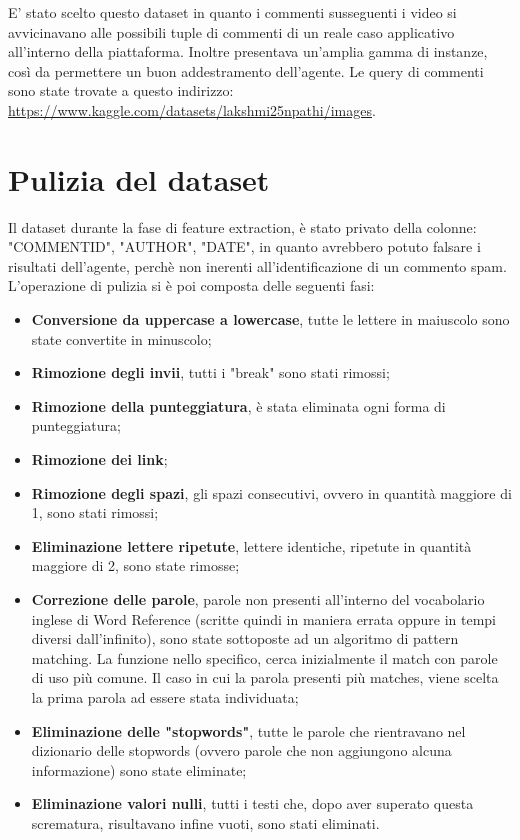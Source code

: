 \documentclass{report}
\begin{document}
    E' stato scelto questo dataset in quanto i commenti susseguenti i video si avvicinavano alle possibili tuple di commenti
    di un reale caso applicativo all'interno della piattaforma.
    Inoltre presentava un'amplia gamma di instanze, così da permettere un buon addestramento dell'agente.
    Le query di commenti sono state trovate a questo indirizzo: \newline 
    \href{https://www.kaggle.com/datasets/lakshmi25npathi/images}{https://www.kaggle.com/datasets/lakshmi25npathi/images}.
    
    \section{Pulizia del dataset}
    Il dataset durante la fase di feature extraction, 
    è stato privato della colonne: "COMMENT\textunderscore ID", "AUTHOR", "DATE", in quanto avrebbero potuto falsare i risultati dell'agente, 
    perchè non inerenti all'identificazione di un commento spam.
    L'operazione di pulizia si è poi composta delle seguenti fasi: 

    \begin{itemize}
        \item {\bfseries Conversione da uppercase a lowercase}, tutte le lettere in maiuscolo sono state convertite in minuscolo;
        \item {\bfseries Rimozione degli invii}, tutti i "break" sono stati rimossi;
        \item {\bfseries Rimozione della punteggiatura}, è stata eliminata ogni forma di punteggiatura;
        \item {\bfseries Rimozione dei link};
        \item {\bfseries Rimozione degli spazi}, gli spazi consecutivi, ovvero in  quantità maggiore di 1, sono stati rimossi;
        \item {\bfseries Eliminazione lettere ripetute}, lettere identiche, ripetute in quantità maggiore di 2, sono state rimosse;
        \item {\bfseries Correzione delle parole}, parole non presenti all'interno del vocabolario inglese di Word Reference (scritte quindi in maniera errata oppure in tempi diversi dall'infinito), sono state sottoposte 
        ad un algoritmo di pattern matching. La funzione nello specifico, cerca inizialmente il match con parole di uso più comune. Il caso in cui
        la parola presenti più matches, viene scelta la prima parola ad essere stata individuata;
        \item {\bfseries Eliminazione delle "stopwords"}, tutte le parole che rientravano nel dizionario delle stopwords (ovvero parole che non aggiungono alcuna informazione) 
        sono state eliminate;
        \item {\bfseries Eliminazione valori nulli}, tutti i testi che, dopo aver superato questa scrematura, risultavano infine vuoti, sono stati eliminati.

 
    \end{itemize}
    \newpage
    
\end{document}
